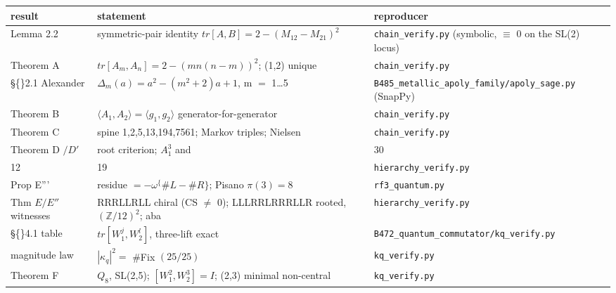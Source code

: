 \documentclass[11pt]{article}
\theoremstyle{plain}
\theoremstyle{definition}
\theoremstyle{remark}
\begin{document}
\begin{center}\small\begin{tabular}{lll}\hline

\textbf{result} & \textbf{statement} & \textbf{reproducer} \\ \hline

Lemma 2.2 & symmetric-pair identity \(tr[A,B] = 2 - (M_{12}-M_{21})^{2}\) & \texttt{chain\_verify.py} (symbolic, \(\equiv \) 0 on the SL(2) locus) \\

Theorem A & \(tr[A_{m},A_{n}] = 2 - (mn(n-m))^{2}\); (1,2) unique & \texttt{chain\_verify.py} \\

\S\{\}2.1 Alexander & \(\Delta _{m}(a) = a^{2} - (m^{2}+2)a + 1\), m \(=\) 1…5 & \texttt{B485\_metallic\_apoly\_family/apoly\_sage.py} (SnapPy) \\

Theorem B & \(\langle A_{1},A_{2}\rangle  = \langle g_{1},g_{2}\rangle \) generator-for-generator & \texttt{chain\_verify.py} \\

Theorem C & spine 1,2,5,13,194,7561; Markov triples; Nielsen & \texttt{chain\_verify.py} \\

Theorem D \(/ D\prime \) & root criterion; \(A_{1}^{3}\) and \(\left(\begin{smallmatrix}19 & 30\\12 & 19\end{smallmatrix}\right)\) counterexamples; \(h=1\) iff & \texttt{hierarchy\_verify.py} \\

Prop E''' & residue \(= -\omega ^\{\#L-\#R\}\); Pisano \(\pi (3)=8\) & \texttt{rf3\_quantum.py} \\

Thm \(E/E″\) witnesses & RRRLLRLL chiral (CS \(\neq \) 0); LLLRRLRRRLLR rooted, \((\mathbb{Z}/12)^{2}\); aba & \texttt{hierarchy\_verify.py} \\

\S\{\}4.1 table & \(tr[W_{1}^{j},W_{2}^{l}]\), three-lift exact & \texttt{B472\_quantum\_commutator/kq\_verify.py} \\

magnitude law & \(|\kappa _{q}|^{2} =\) \#Fix \((25/25)\) & \texttt{kq\_verify.py} \\

Theorem F & \(Q_{8}\), SL(2,5); \([W_{1}^{2},W_{2}^{3}]=I\); (2,3) minimal non-central & \texttt{kq\_verify.py} \\


\end{tabular}
\end{center}
\end{document}
